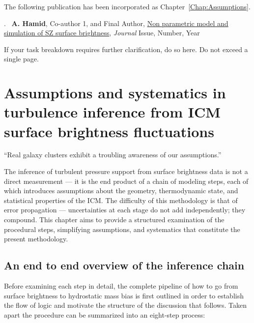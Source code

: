 \cleartoevenpage
\pagestyle{empty}	

\noindent
The following publication has been incorporated as Chapter~\ref{Chap:Assumptions}.

.~\cite{DumyCitationKey} \textbf{A. Hamid}, Co-author 1, and Final Author, \href{linktoyourpaper}{Non parametric model and simulation of SZ surface brightness}, \textit{Journal} Issue, Number, Year


If your task breakdown requires further clarification, do so here. Do not exceed a single page.

\chapter[Assumptions and Systematics of Turbulence Inference]{Assumptions and systematics in turbulence inference from ICM surface brightness fluctuations}\label{Chap:assumptionsTitle}

\epigraph{``Real galaxy clusters exhibit a troubling awareness of our assumptions.''}{}

\pagestyle{headings}

The inference of turbulent pressure support from surface brightness data is not a direct measurement — it is the end product of a chain of modeling steps, each of which introduces assumptions about the geometry, thermodynamic state, and statistical properties of the ICM. The difficulty of this methodology is that of error propagation — uncertainties at each stage do not add independently; they compound. This chapter aims to provide a structured examination of the procedural steps, simplifying assumptions, and systematics that constitute the present methodology. 

\section{An end to end overview of the inference chain}\label{Chap:assumptionsummaryPipeline}

Before examining each step in detail, the complete pipeline of how to go from surface brightness to hydrostatic mass bias is first outlined in order to establish the flow of logic and motivate the structure of the discussion that follows. Taken apart the procedure can be summarized into an eight-step process:

